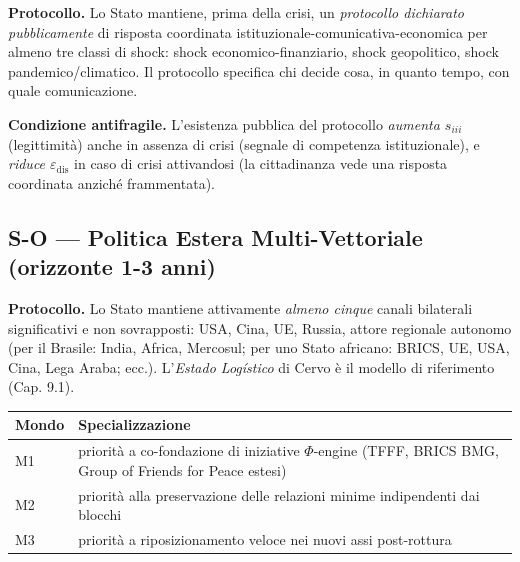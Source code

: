 \Hypoth{} \textbf{Protocollo.} Lo Stato mantiene, prima della crisi, un
\emph{protocollo dichiarato pubblicamente} di risposta coordinata
istituzionale-comunicativa-economica per almeno tre classi di shock:
shock economico-finanziario, shock geopolitico, shock
pandemico/climatico. Il protocollo specifica chi decide cosa, in quanto
tempo, con quale comunicazione.

\Proved{} \textbf{Condizione antifragile.} L'esistenza pubblica del
protocollo \emph{aumenta \(s_{iii}\)} (legittimità) anche in assenza di
crisi (segnale di competenza istituzionale), e \emph{riduce
\(\varepsilon_{\text{dis}}\)} in caso di crisi attivandosi (la
cittadinanza vede una risposta coordinata anziché frammentata).

\subsection{S-O --- Politica Estera Multi-Vettoriale (orizzonte 1-3
anni)}\label{s-o-politica-estera-multi-vettoriale-orizzonte-1-3-anni}

\Hypoth{} \textbf{Protocollo.} Lo Stato mantiene attivamente
\emph{almeno cinque} canali bilaterali significativi e non sovrapposti:
USA, Cina, UE, Russia, attore regionale autonomo (per il Brasile: India,
Africa, Mercosul; per uno Stato africano: BRICS, UE, USA, Cina, Lega
Araba; ecc.). L'\emph{Estado Logístico} di Cervo è il modello di
riferimento (Cap. 9.1).

{\def\LTcaptype{none} %
{\small\begin{longtable}[]{@{}
  >{\raggedright\arraybackslash}p{}
  >{\raggedright\arraybackslash}p{}@{}}
\toprule\noalign{}
\begin{minipage}[b]{\linewidth}\raggedright
Mondo
\end{minipage} & \begin{minipage}[b]{\linewidth}\raggedright
Specializzazione
\end{minipage} \\
\midrule\noalign{}
\endhead
\bottomrule\noalign{}
\endlastfoot
M1 & priorità a co-fondazione di iniziative \(\Phi\)-engine (TFFF, BRICS
BMG, Group of Friends for Peace estesi) \\
M2 & priorità alla preservazione delle relazioni minime indipendenti dai
blocchi \\
M3 & priorità a riposizionamento veloce nei nuovi assi post-rottura \\
\end{longtable}}
}

